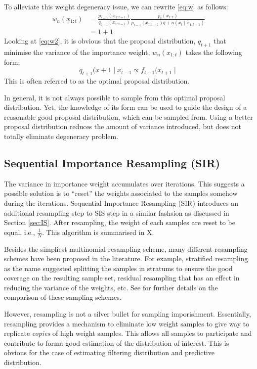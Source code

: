 To alleviate this weight degeneracy issue, we can rewrite \eqref{eq:w} as follows:
\begin{align}
 w_n(x_{1:t}) &= \frac{p_{t-1}(x_{1:t-1})}{q_{t-1}(x_{1:t-1})} \frac{p_t(x_{1:t})}{p_{t-1}(x_{1:t-1})q+n(x_t \mid x_{1:t-1})} \nonumber \\
              &= 1+1
\label{eq:w2}
\end{align}
Looking at \eqref{eq:w2}, it is obvious that the proposal distribution, $q_{t+1}$ that minimise the variance of the importance weight, $w_n(x_{1:t})$ takes the following form:
\begin{equation}
 q_{t+1}(x+1 \mid x_{t-1} \propto f_{t+1}(x_{t+1} \mid
\end{equation}
This is often referred to as the optimal proposal distribution.

In general, it is not always possible to sample from this optimal proposal distribution. Yet, the knowledge of its form can be used to guide the design of a reasonable good proposal distribution, which can be sampled from. Using a better proposal distribution reduces the amount of variance introduced, but does not totally eliminate degeneracy problem.

\subsection{Sequential Importance Resampling (SIR)}
The variance in importance weight accumulates over iterations. This suggests a possible solution is to ``reset'' the weights associated to the samples somehow during the iterations. Sequential Importance Resampling (SIR) introduces an additional resampling step to SIS step in a similar fashsion as discussed in Section \ref{sec:IS}. After resampling, the weight of each samples are reset to be equal, i.e., $\frac{1}{N}$. This algorithm is summarised in X.

Besides the simpliest multinomial resampling scheme, many different resampling schemes have been proposed in the literature. For example, stratified resampling \cite{} as the name suggested splitting the samples in stratums to ensure the good coverage on the resulting sample set, residual resampling \cite{} that has an effect in reducing the variance of the weights, etc. See \cite{} for further details on the comparison of these sampling schemes.

However, resampling is not a silver bullet for sampling imporishment. Essentially, resampling provides a mechanism to eliminate low weight samples to give way to replicate \emph{copies} of high weight samples. This allows all samples to participate and contribute to forma  good estimation of the distribution of interest. This is obvious for the case of estimating filtering distribution and predictive distribution.

